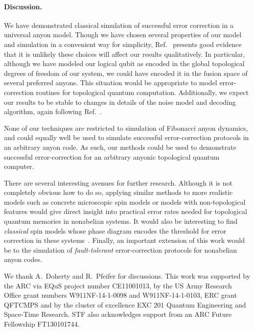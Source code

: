 \documentclass[aps, prl, letterpaper, twocolumn, superscriptaddress, notitlepage, 10pt]{revtex4-1}
\begin{document}
\paragraph{Discussion.}

We have demonstrated classical simulation of successful error correction in a universal anyon model. 
Though we have chosen several properties of our model and 
simulation in a convenient way for simplicity,
Ref.~\cite{Brell2013} presents good evidence that it is
unlikely these choices will affect our results qualitatively.
In particular, although we have modeled our logical qubit as 
encoded in the global topological degrees of freedom of our 
system, we could have encoded it in the fusion space of several preferred anyons. 
This situation would be appropriate to model error-correction routines for topological quantum computation. 
Additionally, we expect our results to be stable to changes in details of the noise model and decoding algorithm, again following Ref.~\cite{Brell2013}.

None of our techniques are restricted to simulation of Fibonacci anyon dynamics, and could 
equally well be used to simulate successful error-correction protocols in an arbitrary anyon code. 
As such, our methods could be used to demonstrate successful 
error-correction for an arbitrary anyonic topological quantum computer.

There are several interesting avenues for further research. 
Although it is not completely obvious how to do so, 
applying similar methods to more realistic models such as concrete 
microscopic spin models or models with non-topological features would give 
direct insight into practical error rates needed for topological quantum memories in nonabelian systems. 
It would also be interesting to find \emph{classical} spin models 
whose phase diagram encodes the threshold for error correction in these systems~\cite{Dennis2002}.
Finally, an important extension of this work would be to the simulation of \emph{fault-tolerant} error-correction protocols for nonabelian anyon codes. 


\acknowledgments 

We thank A.\ Doherty and R.\ Pfeifer for discussions. 
This work was supported by the ARC via EQuS project number CE11001013, by the US Army Research Office grant numbers W911NF-14-1-0098 and W911NF-14-1-0103, ERC grant QFTCMPS and by the cluster of excellence EXC 201 Quantum Engineering and Space-Time Research. STF also acknowledges support from an ARC Future Fellowship FT130101744.
\end{document}
